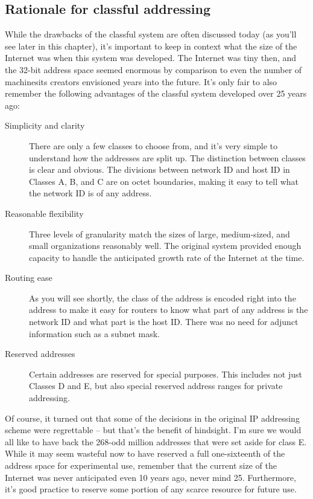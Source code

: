 \documentclass[b5paper,11pt]{memoir}
\begin{document}
\subsection{Rationale for classful addressing}

While the drawbacks of the classful system are often discussed today (as
you'll see later in this chapter), it's important to keep in context
what the size of the Internet was when this system was developed. The
Internet was tiny then, and the 32-bit address space seemed enormous by
comparison to even the number of machinesits creators envisioned years
into the future. It's only fair to also remember the following
advantages of the classful system developed over 25 years ago:

\begin{description}
   \item[Simplicity and clarity]
      There are only a few classes to choose from, and it's very simple to understand how the addresses are split up.
      The distinction between classes is clear and obvious.
      The divisions between network ID and host ID in Classes A, B, and C are on octet boundaries, making it easy to tell what the network ID is of any address.

   \item[Reasonable flexibility]
      Three levels of granularity match the sizes of large, medium-sized, and small organizations reasonably well.
      The original system provided enough capacity to handle the anticipated growth rate of the Internet at the time.

   \item[Routing ease]
      As you will see shortly, the class of the address is encoded right into the address to make it easy for routers to know what part of any address is the network ID and what part is the host ID.
      There was no need for adjunct information such as a subnet mask.

   \item[Reserved addresses]
      Certain addresses are reserved for special purposes.
      This includes not just Classes D and E, but also special reserved address ranges for private addressing.
   \end{description}

Of course, it turned out that some of the decisions in the original IP addressing scheme were regrettable -- but that's the benefit of hindsight.
I'm sure we would all like to have back the 268-odd million addresses that were set aside for class E.
While it may seem wasteful now to have reserved a full one-sixteenth of the address space for experimental use, remember that the current size of the Internet was never anticipated even 10 years ago, never mind 25.
Furthermore, it's good practice to reserve some portion of any scarce resource for future use.
\end{document}
